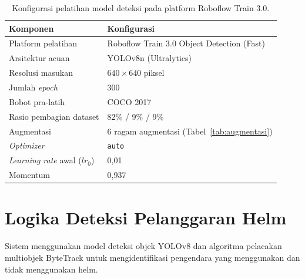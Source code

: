 \begin{table}[H]
\centering
\caption{Konfigurasi pelatihan model deteksi pada platform Roboflow Train 3.0.}
\label{tab:hyperparameter-pelatihan}
\begin{tabular}{ll}
\hline
\textbf{Komponen} & \textbf{Konfigurasi} \\
\hline
Platform pelatihan          & Roboflow Train 3.0 Object Detection (Fast) \\
Arsitektur acuan            & YOLOv8n (Ultralytics) \\
Resolusi masukan            & $640 \times 640$ piksel \\
Jumlah \textit{epoch}       & 300 \\
Bobot pra-latih             & COCO 2017 \\
Rasio pembagian dataset     & 82\% / 9\% / 9\% \\
Augmentasi                  & 6 ragam augmentasi (Tabel~\ref{tab:augmentasi}) \\
\textit{Optimizer}          & \texttt{auto} \\
\textit{Learning rate} awal ($lr_0$) & 0,01 \\
Momentum                    & 0,937 \\
\hline
\end{tabular}
\end{table}


\section{Logika Deteksi Pelanggaran Helm}
\label{sec:logika-deteksi}

Sistem menggunakan model deteksi objek YOLOv8 dan algoritma pelacakan multiobjek ByteTrack untuk mengidentifikasi pengendara yang menggunakan dan tidak menggunakan helm.

